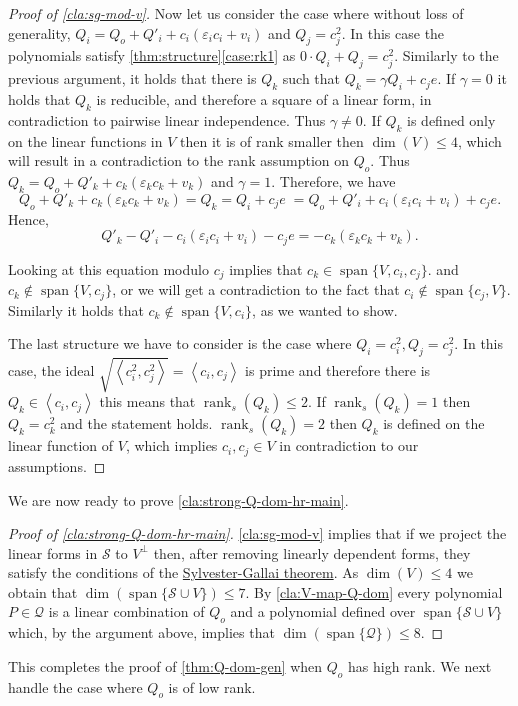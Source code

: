 \documentclass[10pt,a4paper]{article}
\def\rank{\operatorname{rank}}
\newcommand{\cQ}{{\mathcal{Q}}}
\newcommand{\calS}{{\mathcal{S}}}
\newcommand{\ideal}[1]{\left \langle{#1}\right \rangle}
\newcommand{\spn}[1]{\operatorname{span}\{{#1}\}}
\def\epsilon{\varepsilon}
\begin{document}
\begin{proof}[Proof of \autoref{cla:sg-mod-v}]
Now let us consider the case where without loss of generality, $Q_i = Q_o +Q'_i + c_i(\epsilon_i c_i + v_i)$ and $Q_j = c_j^2$. In this case the polynomials satisfy   \autoref{thm:structure}\ref{case:rk1} as $0 \cdot Q_i + Q_j = c_j^2$.
Similarly to the previous argument, it holds that there is $Q_k$ such that $Q_k = \gamma Q_i + c_j e$. If $\gamma =0$ it holds that $Q_k$ is reducible, and therefore a square of a linear form, in contradiction to pairwise linear independence. Thus $\gamma \neq 0$. If $Q_k$ is defined only on the linear functions in $V$ then it is of rank smaller then $\dim(V) \leq 4$, which will result in a contradiction to the rank assumption on $Q_o$. Thus $Q_k = Q_o + Q'_k + c_k(\epsilon_k c_k + v_k)$ and $\gamma = 1$. Therefore, we have 
\[ Q_o + Q'_k + c_k(\epsilon_k c_k + v_k) = Q_k = Q_i + c_j e\; = Q_o + Q'_i + c_i(\epsilon_i c_i + v_i)+ c_j e.\]
Hence,
\[Q'_k - Q'_i -c_i(\epsilon_i c_i + v_i) - c_je= -c_k(\epsilon_k c_k + v_k).\] 

Looking at this equation modulo $c_j$ implies that $c_k \in \spn{V, c_i, c_j}$. and $c_k \notin \spn{V, c_j}$, or we will get a contradiction to the fact that $c_i \notin\spn{c_j ,V}$. Similarly it holds that $c_k \notin \spn{V, c_i}$, as we wanted to show.

The last structure we have to consider is the case where $Q_i = c_i^2, Q_j = c_j^2$. In this case, the ideal $\sqrt{\ideal{c_i^2,c_j^2}} = \ideal{c_i,c_j}$ is prime and therefore there is $Q_k \in \ideal{c_i,c_j}$ this means that $\rank_s(Q_k) \leq 2$. If $\rank_s(Q_k) = 1$ then $Q_k = c_k^2$ and the statement holds. $\rank_s(Q_k) = 2$ then $Q_k$ is defined on the linear function of $V$,  which implies $c_i,c_j \in V$ in contradiction to our assumptions.
\end{proof}
We are now ready to prove \autoref{cla:strong-Q-dom-hr-main}.
\begin{proof}[Proof of \autoref{cla:strong-Q-dom-hr-main}]
\autoref{cla:sg-mod-v} implies that if we project the linear forms in $\calS$ to $V^\perp$ then, after removing linearly dependent forms, they satisfy the conditions of the \hyperref[thm:SG-linforms]{Sylvester-Gallai theorem}. As $\dim(V)\leq 4$ we obtain that $\dim(\spn{\calS\cup V}) \leq 7$. 
By \autoref{cla:V-map-Q-dom} every polynomial $P\in\cQ$ is a linear combination of $Q_o$ and a polynomial defined over $\spn{\calS\cup V}$ which, by the argument above, implies that $\dim(\spn{\cQ})\leq 8$. 
\end{proof}

This completes the proof of  \autoref{thm:Q-dom-gen} when  $Q_o$ has high rank.
We next handle the case where $Q_o$ is of low rank. 
\end{document}
